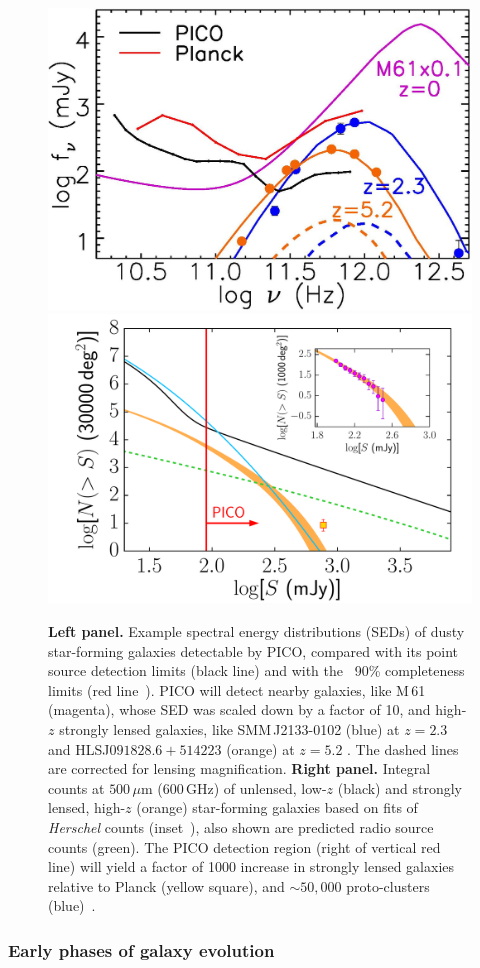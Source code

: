 \documentclass[PICOReport.tex]{subfiles}
\begin{document}
\begin{figure}
\begin{center}
\includegraphics[width=0.41\columnwidth, trim={0 0 0 0cm}, clip]{images/fig_SED_PICO.jpg}
\hspace{0.75cm}
\includegraphics[width=0.4\columnwidth, trim={0 0 0 0cm}, clip]{images/NgtF_pico_NEW.pdf}
\vskip-0.3cm
\caption{\textbf{Left panel.} Example spectral energy distributions (SEDs) of dusty star-forming galaxies detectable by PICO, compared with its point source detection limits (black line) and with the \planck\ 90\% completeness limits (red line~\cite{PCCS2}). PICO will detect nearby galaxies, like M\,61 (magenta), whose SED was scaled down by a factor of 10, and high-$z$ strongly lensed galaxies, like SMM\,J2133-0102 (blue)  at $z=2.3$ \cite{Swinbank2010} and HLSJ$091828.6{+}514223$ (orange) at $z=5.2$ \cite{Combes2012}. The dashed lines are corrected for lensing magnification.  \textbf{Right panel.} Integral counts at $500\,\mu$m (600\,GHz) of unlensed, low-$z$ (black) and strongly lensed, high-$z$ (orange) star-forming galaxies based on fits of \textit{Herschel} counts (inset~\citep{Negrello2017lensed}), also shown are predicted radio source counts (green). The PICO detection region (right of vertical red line) will yield a factor of 1000 increase in strongly lensed galaxies relative to Planck (yellow square),
and $\sim50,000$ proto-clusters (blue)~\citep{Negrello2017protocl}.}
\label{fig:SED3}
\end{center}
\vspace{-0.15in}
\end{figure}

\subsubsection{Early phases of galaxy evolution}
\end{document}
